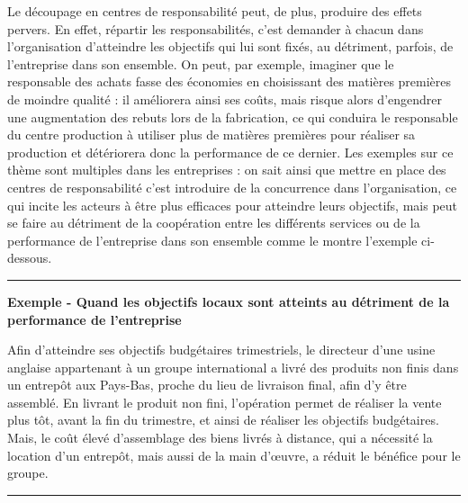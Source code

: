 \documentclass[oneside]{kaobook}
\begin{document}
Le découpage en centres de responsabilité peut, de plus, produire des effets pervers. En effet, répartir les responsabilités, c’est demander à chacun dans l’organisation d’atteindre les objectifs qui lui sont fixés, au détriment, parfois, de l’entreprise dans son ensemble. On peut, par exemple, imaginer que le responsable des achats fasse des économies en choisissant des matières premières de moindre qualité : il améliorera ainsi ses coûts, mais risque alors d’engendrer une augmentation des rebuts lors de la fabrication, ce qui conduira le responsable du centre production à utiliser plus de matières premières pour réaliser sa production et détériorera donc la performance de ce dernier. Les exemples sur ce thème sont multiples dans les entreprises : on sait ainsi que mettre en place des centres de responsabilité c’est introduire de la concurrence dans l’organisation, ce qui incite les acteurs à être plus efficaces pour atteindre leurs objectifs, mais peut se faire au détriment de la coopération entre les différents services ou de la performance de l’entreprise dans son ensemble comme le montre l’exemple ci-dessous.

\noindent\rule{\textwidth}{0.5pt}
\textbf{Exemple - Quand les objectifs locaux sont atteints au détriment de la performance de l’entreprise}

Afin d’atteindre ses objectifs budgétaires trimestriels, le directeur d’une usine anglaise appartenant à un groupe international a livré des produits non finis dans un entrepôt aux Pays-Bas, proche du lieu de livraison final, afin d’y être assemblé. En livrant le produit non fini, l’opération permet de réaliser la vente plus tôt, avant la fin du trimestre, et ainsi de réaliser les objectifs budgétaires. Mais, le coût élevé d’assemblage des biens livrés à distance, qui a nécessité la location d’un entrepôt, mais aussi de la main d’œuvre, a réduit le bénéfice pour le groupe.

\noindent\rule{\textwidth}{0.5pt}
\end{document}
